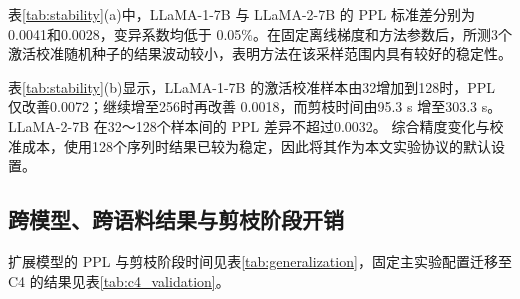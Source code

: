 \documentclass[UTF8,fontset=fandol]{ctexart}
\begin{document}
表\ref{tab:stability}(a)中，LLaMA-1-7B 与 LLaMA-2-7B 的 PPL 标准差分别为0.0041和0.0028，变异系数均低于
0.05\%。在固定离线梯度和方法参数后，所测3个激活校准随机种子的结果波动较小，表明方法在该采样范围内具有较好的稳定性。

表\ref{tab:stability}(b)显示，LLaMA-1-7B 的激活校准样本由32增加到128时，PPL 仅改善0.0072；继续增至256时再改善
0.0018，而剪枝时间由95.3 s 增至303.3 s。LLaMA-2-7B 在32～128个样本间的 PPL 差异不超过0.0032。
综合精度变化与校准成本，使用128个序列时结果已较为稳定，因此将其作为本文实验协议的默认设置。

\FloatBarrier
\subsection{跨模型、跨语料结果与剪枝阶段开销}

扩展模型的 PPL 与剪枝阶段时间见表\ref{tab:generalization}，固定主实验配置迁移至 C4 的结果见表\ref{tab:c4_validation}。
\end{document}
